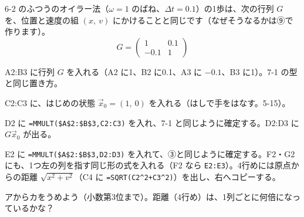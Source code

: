\begin{yattemiyou}
6-2 のふつうのオイラー法（$\omega=1$ のばね、$\Delta t=0.1$）の1歩は、次の行列 $G$ を、位置と速度の組 $(x,\ v)$ にかけることと同じです（なぜそうなるかは⑨で作ります）。
\[ G=\begin{pmatrix}1&0.1\\-0.1&1\end{pmatrix} \]
\begin{enumerate}[label={\bkcircled[bkGreen]{\arabic*}}, leftmargin=2.4\zw, itemsep=1pt, topsep=3pt]
\item A2:B3 に行列 $G$ を入れる（A2 に1、B2 に0.1、A3 に $-0.1$、B3 に1）。7-1 の型と同じ置き方。
\item C2:C3 に、はじめの状態 $\vec x_0=(1,\ 0)$ を入れる（はしで手をはなす。5-15）。
\item D2 に \texttt{=MMULT(\$A\$2:\$B\$3,C2:C3)} を入れ、7-1 と同じように確定する。D2:D3 に $G\vec x_0$ が出る。
\item E2 に \texttt{=MMULT(\$A\$2:\$B\$3,D2:D3)} を入れて、③と同じように確定する。F2・G2 にも、1つ左の列を指す同じ形の式を入れる（F2 なら \texttt{E2:E3}）。4行めには原点からの距離 $\sqrt{x^2+v^2}$（C4 に \texttt{=SQRT(C2\^{}2+C3\^{}2)}）を出し、右へコピーする。
\end{enumerate}
\begin{bkcenter}
\par\vspace{1mm}
\end{bkcenter}
\vspace{2pt}
アからカをうめよう（小数第3位まで）。距離（4行め）は、1列ごとに何倍になっているかな？
\end{yattemiyou}

